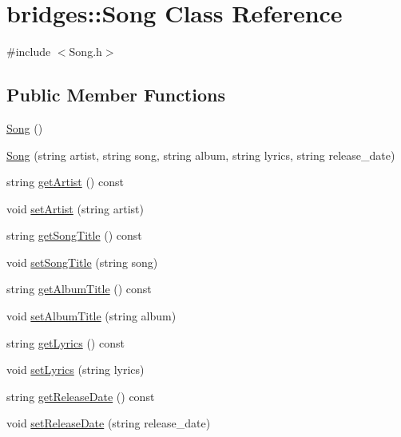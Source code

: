 \hypertarget{classbridges_1_1_song}{}\section{bridges\+:\+:Song Class Reference}
\label{classbridges_1_1_song}


{\ttfamily \#include $<$Song.\+h$>$}

\subsection*{Public Member Functions}
\begin{DoxyCompactItemize}
\item 
\hyperlink{classbridges_1_1_song_aa938ae0bd6d566d6e2a6bf30beeb0ea5}{Song} ()
\item 
\hyperlink{classbridges_1_1_song_a45112419f649ca32150b170c946d3441}{Song} (string artist, string song, string album, string lyrics, string release\+\_\+date)
\item 
string \hyperlink{classbridges_1_1_song_a7accc90f3ae5c82a2b264c14cfc77d4e}{get\+Artist} () const 
\item 
void \hyperlink{classbridges_1_1_song_a644985bf7524af0200b42f9a5148e38e}{set\+Artist} (string artist)
\item 
string \hyperlink{classbridges_1_1_song_a3359e4d48d22d0937e8839dcd2be6a2c}{get\+Song\+Title} () const 
\item 
void \hyperlink{classbridges_1_1_song_aed396fe05fd2bcb61e23ecca0d4a2047}{set\+Song\+Title} (string song)
\item 
string \hyperlink{classbridges_1_1_song_a8a19a328a49845693adba066daa3c2cc}{get\+Album\+Title} () const 
\item 
void \hyperlink{classbridges_1_1_song_a9f9b3f86914ee18db5de48166b350723}{set\+Album\+Title} (string album)
\item 
string \hyperlink{classbridges_1_1_song_a4d5ea68a66519410c184f49d5631a1c8}{get\+Lyrics} () const 
\item 
void \hyperlink{classbridges_1_1_song_ae0a57f15c3f015238c28fe08d1adea5a}{set\+Lyrics} (string lyrics)
\item 
string \hyperlink{classbridges_1_1_song_a494bb0e17f722f5d2bc4aee75f3941b8}{get\+Release\+Date} () const 
\item 
void \hyperlink{classbridges_1_1_song_a8e9453f5ec33b5d9865788beb4cc68e0}{set\+Release\+Date} (string release\+\_\+date)
\end{DoxyCompactItemize}


